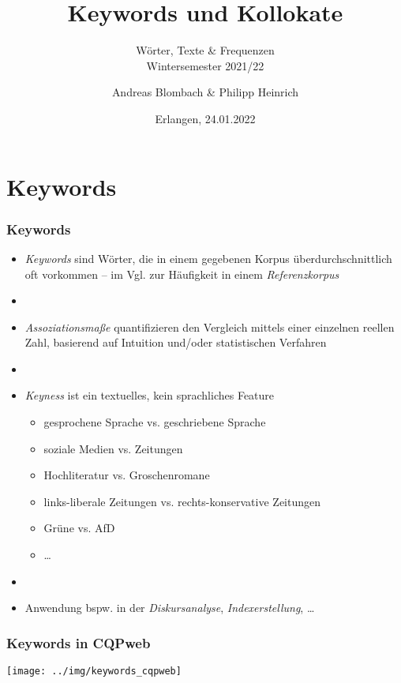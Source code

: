 \documentclass[aspectratio=1610,t]{beamer} %
\title{\textbf{Keywords und Kollokate}}
\subtitle{Wörter, Texte \& Frequenzen\\Wintersemester 2021/22}
\author[Blombach \& Heinrich]{Andreas Blombach \& Philipp Heinrich}
\institute[]{%
  Lehrstuhl für Korpus- und Computerlinguistik\\
  Friedrich-Alexander-Universität Erlangen-Nürnberg\\
  }
\date[24.01.2022]{Erlangen, 24.01.2022}
\begin{document}
\frame{\titlepage}
\hideLogo

\section{Keywords}

\begin{frame}
  \frametitle{Keywords}
  \begin{itemize}
  \item \emph{Keywords} sind Wörter, die in einem gegebenen Korpus überdurchschnittlich oft vorkommen -- im Vgl. zur Häufigkeit in einem \emph{Referenzkorpus}
  \item[]
  \item \emph{Assoziationsmaße} quantifizieren den Vergleich mittels einer einzelnen reellen Zahl, basierend auf Intuition und/oder statistischen Verfahren
  \item[]
  \item \emph{Keyness} ist ein textuelles, kein sprachliches Feature
    \begin{itemize}
    \item gesprochene Sprache vs. geschriebene Sprache
    \item soziale Medien vs. Zeitungen
    \item Hochliteratur vs. Groschenromane
    \item links-liberale Zeitungen vs. rechts-konservative Zeitungen
    \item Grüne vs. AfD
    \item \ldots
    \end{itemize}
  \item[]
  \item Anwendung bspw. in der \emph{Diskursanalyse}, \emph{Indexerstellung}, \ldots
  \end{itemize}
\end{frame}

\begin{frame}[c]
  \frametitle{Keywords in CQPweb}
  \centering
  \texttt{[image: ../img/keywords\_cqpweb]}
\end{frame}
\end{document}
